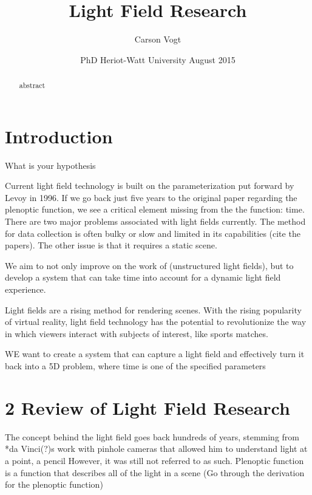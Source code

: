 \documentclass[12pt]{report}
\begin{document}
\title{Light Field Research \vspace{2.5cm}}	%
\author{
\Large Carson Vogt \vspace{1cm} \\ 
}

\date{
	\centering
	PhD \endgraf\medskip
	Heriot-Watt University \endgraf{} August 2015
}

\maketitle

\begin{abstract}
\begin{small}
abstract
\end{small}
\end{abstract}

\listoffigures

\tableofcontents

\chapter{Introduction}
What is your hypothesis

Current light field technology is built on the parameterization put forward by Levoy in 1996. If we go back just five years to the original paper regarding the plenoptic function, we see a critical element missing from the the function: time. There are two major problems associated with light fields currently. The method for data collection is often bulky or slow and limited in its capabilities (cite the papers). The other issue is that it requires a static scene. 

We aim to not only improve on the work of (unstructured light fields), but to develop a system that can take time into account for a dynamic light field experience. 

Light fields are a rising method for rendering scenes. With the rising popularity of virtual reality, light field technology has the potential to revolutionize the way in which viewers interact with subjects of interest, like sports matches.

WE want to create a system that can capture a light field and effectively turn it back into a 5D problem, where time is one of the specified parameters

\chapter*{2 Review of Light Field Research}
The concept behind the light field goes back hundreds of years, stemming from *da Vinci(?)s work with pinhole cameras that allowed him to understand light at a point, a pencil
However, it was still not referred to as such. 
Plenoptic function \cite{Adelson91} is a function that describes all of the light in a scene
(Go through the derivation for the plenoptic function)
\end{document}
